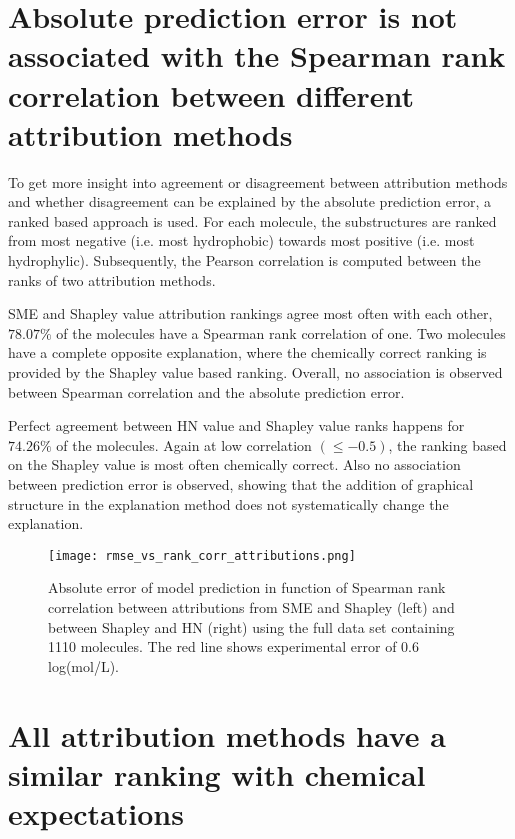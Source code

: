 \section{Absolute prediction error is not associated with the Spearman rank correlation between different attribution methods}


To get more insight into agreement or disagreement between attribution methods
and whether disagreement can be explained by the absolute prediction 
error, a ranked based approach is used. For each molecule, the substructures are ranked  
from most negative (i.e. most hydrophobic) towards most positive (i.e. most hydrophylic). 
Subsequently, the Pearson correlation is computed between the ranks of two attribution methods.


SME and Shapley value attribution rankings agree most often with each other, $78.07\%$
of the molecules have a Spearman rank correlation of one. Two molecules have 
a complete opposite explanation, where the chemically correct ranking is provided by the 
Shapley value based ranking. Overall, no association is observed between Spearman 
correlation and the absolute prediction error. 


Perfect agreement between HN value and Shapley value ranks happens for 
$74.26\%$ of the molecules. Again at low correlation $( \le -0.5)$, the ranking based on 
the Shapley value is most often chemically correct. Also no association between prediction error 
is observed, showing that the addition of graphical structure in the explanation 
method does not systematically change the explanation.


 

\begin{figure}[h]
    \centering
    \texttt{[image: rmse\_vs\_rank\_corr\_attributions.png]}
    \caption{Absolute error of model prediction in function of Spearman rank correlation between 
        attributions from SME and Shapley (left) and between Shapley and HN (right) using the full 
        data set containing 1110 molecules. The red line shows experimental error of 0.6 log(mol/L).
    }
\end{figure}


\section{All attribution methods have a similar ranking with chemical expectations}

